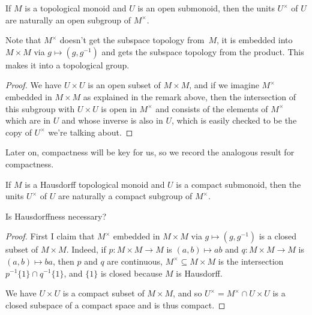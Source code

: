 \begin{lemma}
  \label{Submonoid.units_isOpen}
  \leanok
  If $M$ is a topological monoid and $U$ is an open submonoid, then
  the units $U^\times$ of $U$ are naturally an open subgroup of $M^\times$.
\end{lemma}
\begin{remark} Note that $M^\times$ doesn't get the subspace topology from~$M$,
  it is embedded into $M\times M$ via $g\mapsto (g,g^{-1})$ and gets the subspace
  topology from the product. This makes it into a topological group.
\end{remark}
\begin{proof}
  \leanok
  We have $U\times U$ is an open subset of $M\times M$, and if we imagine $M^\times$
  embedded in $M\times M$ as explained in the remark above, then the intersection
  of this subgroup with $U\times U$ is open in $M^\times$ and consists of the elements
  of $M^\times$ which are in $U$ and whose inverse is also in $U$, which is easily
  checked to be the copy of $U^\times$ we're talking about.
\end{proof}

Later on, compactness will be key for us, so we record the analogous result
for compactness.

\begin{lemma}
  \label{Submonoid.units_isCompact}
  \leanok
  If $M$ is a Hausdorff topological monoid and $U$ is a compact submonoid,
  then the units $U^\times$ of $U$ are naturally a compact subgroup of $M^\times$.
\end{lemma}
\begin{remark} Is Hausdorffness necessary?
\end{remark}
\begin{proof}
  First I claim that $M^\times$ embedded in $M\times M$ via $g\mapsto (g,g^{-1})$
  is a closed subset of $M\times M$. Indeed, if $p:M\times M\to M$ is $(a,b)\mapsto ab$
  and $q:M\times M\to M$ is $(a,b)\mapsto ba$, then $p$ and $q$ are continuous,
  $M^\times\subseteq M\times M$ is the intersection
  $p^{-1}\{1\}\cap q^{-1}\{1\}$, and $\{1\}$ is closed because $M$ is Hausdorff.

  We have $U\times U$ is a compact subset of $M\times M$, and so
  $U^\times=M^\times\cap U\times U$ is a closed subspace of a compact space
  and is thus compact.
\end{proof}

